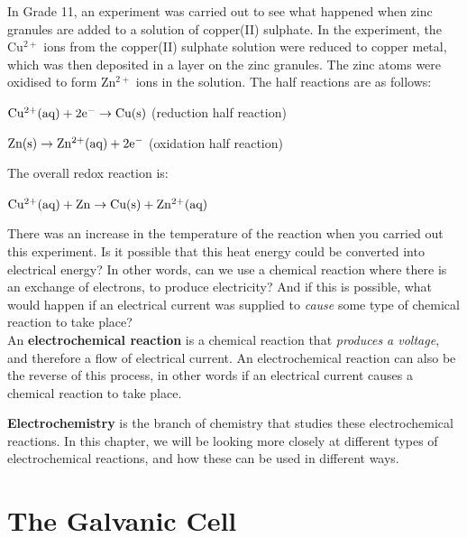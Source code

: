 In Grade 11, an experiment was carried out to see what happened when zinc granules are added to a solution of copper(II) sulphate. In the experiment, the Cu$^{2+}$ ions from the copper(II) sulphate solution were reduced to copper metal, which was then deposited in a layer on the zinc granules. The zinc atoms were oxidised to form Zn$^{2+}$ ions in the solution. The half reactions are as follows: 

\begin{center}
$\rm{Cu^{2+}(aq) + 2e^{-} \rightarrow Cu(s)}$ (reduction half reaction)

$\rm{Zn(s) \rightarrow Zn^{2+}(aq) + 2e^{-}}$ (oxidation half reaction)
\end{center}

The overall redox reaction is:
\begin{center}
$\rm{Cu^{2+}(aq) + Zn \rightarrow Cu(s) + Zn^{2+}(aq)}$
\end{center}

There was an increase in the temperature of the reaction when you carried out this experiment. Is it possible that this heat energy could be converted into electrical energy? In other words, can we use a chemical reaction where there is an exchange of electrons, to produce electricity? And if this is possible, what would happen if an electrical current was supplied to \textit{cause} some type of chemical reaction to take place?\\

An \textbf{electrochemical reaction} is a chemical reaction that \textit{produces a voltage}, and therefore a flow of electrical current. An electrochemical reaction can also be the reverse of this process, in other words if an electrical current causes a chemical reaction to take place.


\textbf{Electrochemistry} is the branch of chemistry that studies these electrochemical reactions. In this chapter, we will be looking more closely at different types of electrochemical reactions, and how these can be used in different ways.







\section{The Galvanic Cell}
\label{sec:electrochemical:galvanic}

